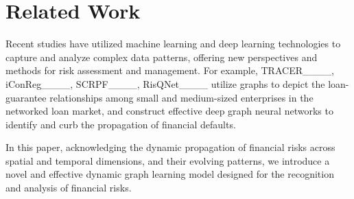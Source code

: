 \section{Related Work}


Recent studies have utilized machine learning and deep learning technologies to capture and analyze complex data patterns, offering new perspectives and methods for risk assessment and management. 
% 
For example, TRACER____, iConReg____, SCRPF____, RisQNet____
utilize graphs to depict the loan-guarantee relationships among small and medium-sized enterprises in the networked loan market, and construct effective deep graph neural networks to identify and curb the propagation of financial defaults.


In this paper, acknowledging the dynamic propagation of financial risks across spatial and temporal dimensions, and their evolving patterns, we introduce a novel and effective dynamic graph learning model designed for the recognition and analysis of financial risks.


